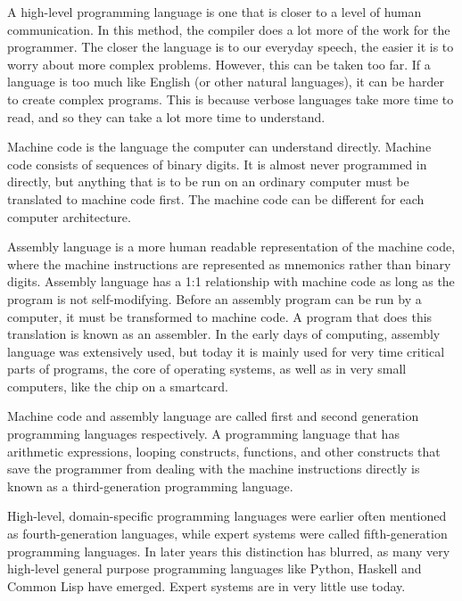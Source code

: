 A high-level programming language is one that is closer to a level of human communication. In this method, the compiler does a lot more of the work for the programmer. The closer the language is to our everyday speech, the easier it is to worry about more complex problems. However, this can be taken too far. If a language is too much like English (or other natural languages), it can be harder to create complex programs. This is because verbose languages take more time to read, and so they can take a lot more time to understand.
\newline

Machine code is the language the computer can understand directly. Machine code consists of sequences of binary digits. It is almost never programmed in directly, but anything that is to be run on an ordinary computer must be translated to machine code first. The machine code can be different for each computer architecture.
\newline

Assembly language is a more human readable representation of the machine code, where the machine instructions are represented as mnemonics rather than binary digits. Assembly language has a 1:1 relationship with machine code as long as the program is not self-modifying. Before an assembly program can be run by a computer, it must be transformed to machine code. A program that does this translation is known as an assembler. In the early days of computing, assembly language was extensively used, but today it is mainly used for very time critical parts of programs, the core of operating systems, as well as in very small computers, like the chip on a smartcard.
\newline

Machine code and assembly language are called first and second generation programming languages respectively. A programming language that has arithmetic expressions, looping constructs, functions, and other constructs that save the programmer from dealing with the machine instructions directly is known as a third-generation programming language.
\newline

High-level, domain-specific programming languages were earlier often mentioned as fourth-generation languages, while expert systems were called fifth-generation programming languages. In later years this distinction has blurred, as many very high-level general purpose programming languages like Python, Haskell and Common Lisp have emerged. Expert systems are in very little use today.

